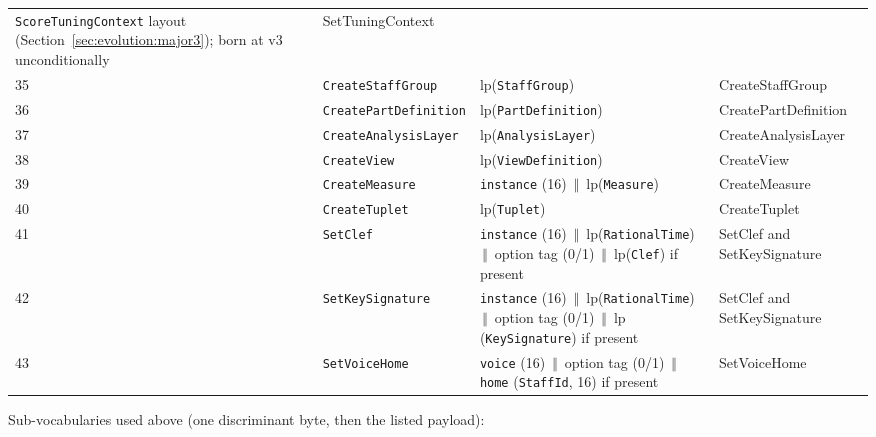 \documentclass[11pt,letterpaper]{report}
\newcommand{\tablenums}[1]{{\addfontfeatures{Numbers={Lining,Tabular}}#1}}
\newcommand{\sectionsc}[1]{{\addfontfeatures{Letters=SmallCaps}#1}}
\newcommand{\cat}{\ensuremath{\,\Vert\,}}
\begin{document}
\begin{longtable}{p{0.32in} >{\raggedright\arraybackslash}p{1.5in} >{\raggedright\arraybackslash}p{2.35in} >{\raggedright\arraybackslash}p{1.35in}}
    \texttt{ScoreTuningContext} layout (Section~\ref{sec:evolution:major3});
    born at v3 unconditionally &
    \sectionsc{SetTuningContext} \\
  \tablenums{35} & \texttt{CreateStaffGroup} &
    $\mathrm{lp}$(\texttt{StaffGroup}) &
    \sectionsc{CreateStaffGroup} \\
  \tablenums{36} & \texttt{CreatePartDefinition} &
    $\mathrm{lp}$(\texttt{PartDefinition}) &
    \sectionsc{CreatePartDefinition} \\
  \tablenums{37} & \texttt{CreateAnalysisLayer} &
    $\mathrm{lp}$(\texttt{AnalysisLayer}) &
    \sectionsc{CreateAnalysisLayer} \\
  \tablenums{38} & \texttt{CreateView} &
    $\mathrm{lp}$(\texttt{ViewDefinition}) &
    \sectionsc{CreateView} \\
  \tablenums{39} & \texttt{CreateMeasure} &
    \texttt{instance} (16) \cat{} $\mathrm{lp}$(\texttt{Measure}) &
    \sectionsc{CreateMeasure} \\
  \tablenums{40} & \texttt{CreateTuplet} &
    $\mathrm{lp}$(\texttt{Tuplet}) &
    \sectionsc{CreateTuplet} \\
  \tablenums{41} & \texttt{SetClef} &
    \texttt{instance} (16) \cat{} $\mathrm{lp}$(\texttt{RationalTime}) \cat{}
    option tag (\tablenums{0}/\tablenums{1}) \cat{}
    $\mathrm{lp}$(\texttt{Clef}) if present &
    \sectionsc{SetClef and SetKeySignature} \\
  \tablenums{42} & \texttt{SetKeySignature} &
    \texttt{instance} (16) \cat{} $\mathrm{lp}$(\texttt{RationalTime}) \cat{}
    option tag (\tablenums{0}/\tablenums{1}) \cat{}
    $\mathrm{lp}$(\texttt{KeySignature}) if present &
    \sectionsc{SetClef and SetKeySignature} \\
  \tablenums{43} & \texttt{SetVoiceHome} &
    \texttt{voice} (16) \cat{} option tag (\tablenums{0}/\tablenums{1})
    \cat{} \texttt{home} (\texttt{StaffId}, 16) if present &
    \sectionsc{SetVoiceHome} \\
  \bottomrule
\end{longtable}
\endgroup

Sub-vocabularies used above (one discriminant byte, then the listed
payload):
\end{document}
